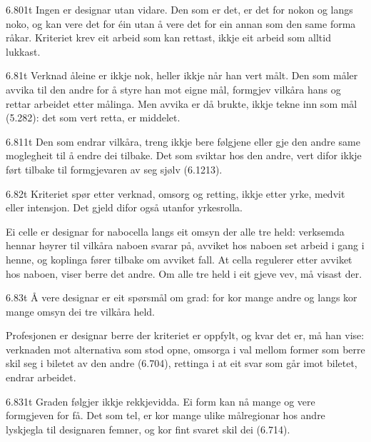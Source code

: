 \begin{formproposition}{6.801}{t}
Ingen er designar utan vidare. Den som er det, er det for nokon og langs noko, og kan vere det for éin utan å vere det for ein annan som den same forma råkar. Kriteriet krev eit arbeid som kan rettast, ikkje eit arbeid som alltid lukkast.
\end{formproposition}

\begin{formproposition}{6.81}{t}
Verknad åleine er ikkje nok, heller ikkje når han vert målt. Den som måler avvika til den andre for å styre han mot eigne mål, formgjev vilkåra hans og rettar arbeidet etter målinga. Men avvika er då brukte, ikkje tekne inn som mål (5.282): det som vert retta, er middelet.
\end{formproposition}

\begin{formproposition}{6.811}{t}
Den som endrar vilkåra, treng ikkje bere følgjene eller gje den andre same moglegheit til å endre dei tilbake. Det som sviktar hos den andre, vert difor ikkje ført tilbake til formgjevaren av seg sjølv (6.1213).
\end{formproposition}

\begin{formproposition}{6.82}{t}
Kriteriet spør etter verknad, omsorg og retting, ikkje etter yrke, medvit eller intensjon. Det gjeld difor også utanfor yrkesrolla.

Ei celle er designar for nabocella langs eit omsyn der alle tre held: verksemda hennar høyrer til vilkåra naboen svarar på, avviket hos naboen set arbeid i gang i henne, og koplinga fører tilbake om avviket fall. At cella regulerer etter avviket hos naboen, viser berre det andre. Om alle tre held i eit gjeve vev, må visast der.
\end{formproposition}

\begin{formproposition}{6.83}{t}
Å vere designar er eit spørsmål om grad: for kor mange andre og langs kor mange omsyn dei tre vilkåra held.

Profesjonen er designar berre der kriteriet er oppfylt, og kvar det er, må han vise: verknaden mot alternativa som stod opne, omsorga i val mellom former som berre skil seg i biletet av den andre (6.704), rettinga i at eit svar som går imot biletet, endrar arbeidet.
\end{formproposition}

\begin{formproposition}{6.831}{t}
Graden følgjer ikkje rekkjevidda. Ei form kan nå mange og vere formgjeven for få. Det som tel, er kor mange ulike målregionar hos andre lyskjegla til designaren femner, og kor fint svaret skil dei (6.714).
\end{formproposition}

